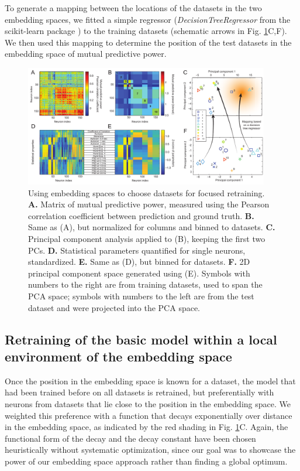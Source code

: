 \documentclass[10pt,letterpaper]{article}
\begin{document}
To generate a mapping between the locations of the datasets in the two embedding spaces, we fitted a simple regressor (\textit{DecisionTreeRegressor} from the scikit-learn package \cite{scikit-learn}) to the training datasets (schematic arrows in Fig. \ref{fig_rupp2}C,F). We then used this mapping to determine the position of the test datasets in the embedding space of mutual predictive power.

\begin{figure}[tb]
\centering
\includegraphics[width=0.95\textwidth]{images/EmbeddingSpaces}
\caption{Using embedding spaces to choose datasets for focused retraining. \textbf{A.} Matrix of mutual predictive power, measured using the Pearson correlation coefficient between prediction and ground truth. \textbf{B.} Same as (A), but normalized for columns and binned to datasets. \textbf{C.} Principal component analysis applied to (B), keeping the first two PCs. \textbf{D.} Statistical parameters quantified for single neurons, standardized. \textbf{E.} Same as (D), but binned for datasets. \textbf{F.} 2D principal component space generated using (E). Symbols with numbers to the right are from training datasets, used to span the PCA space; symbols with numbers to the left are from the test dataset and were projected into the PCA space.}
\label{fig_rupp2}
\end{figure}

\subsection*{Retraining of the basic model within a local environment of the embedding space}

Once the position in the embedding space is known for a dataset, the model that had been trained before on all datasets is retrained, but preferentially with neurons from datasets that lie close to the position in the embedding space. We weighted this preference with a function that decays exponentially over distance in the embedding space, as indicated by the red shading in Fig. \ref{fig_rupp2}C. Again, the functional form of the decay and the decay constant have been chosen heuristically without systematic optimization, since our goal was to showcase the power of our embedding space approach rather than finding a global optimum.
\end{document}

